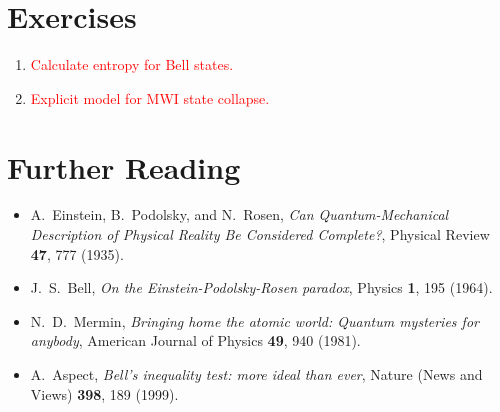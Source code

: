 \documentclass[pra,11pt]{revtex4}
\begin{document}
\section{Exercises}

\begin{enumerate}
\item \textcolor{red}{Calculate entropy for Bell states.}
\item \textcolor{red}{Explicit model for MWI state collapse.}
\end{enumerate}


\section{Further Reading}

\begin{itemize}
\item A.~Einstein, B.~Podolsky, and N.~Rosen,
  \textit{Can Quantum-Mechanical Description of Physical Reality Be
    Considered Complete?}, Physical Review \textbf{47}, 777 (1935).

\item J.~S.~Bell, \textit{On the Einstein-Podolsky-Rosen paradox},
  Physics \textbf{1}, 195 (1964).
  
\item N.~D.~Mermin, \textit{Bringing home the atomic world: Quantum
  mysteries for anybody}, American Journal of Physics \textbf{49}, 940
  (1981).

\item A.~Aspect, \textit{Bell's inequality test: more ideal than ever},
  Nature (News and Views) \textbf{398}, 189 (1999).
\end{itemize}
\end{document}
